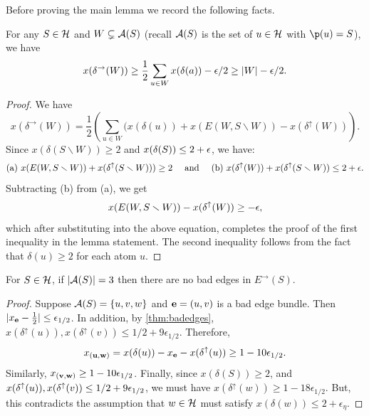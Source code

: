 Before proving the main lemma we record the following facts.
\begin{lemma}
\label{fact:anothercutineq}
For any $S\in \mathcal{H}$ %
and $W \subsetneq {\cal A}(S)$ (recall ${\cal A}(S)$ is the set of $u \in \mathcal{H}$ with $\p(u) = S$), we have 
$$ x(\delta^\rightarrow(W))  %
	\geq \frac12 \sum_{u\in W} x(\delta(a)) - \eps/2 \ge |W| - \eps/2.$$
\end{lemma}
\begin{proof}
We have
$$ x(\delta^\rightarrow (W))  %
= \frac12 \left(\sum_{u \in W} (x(\delta (u)) +   x(	E(W, S\smallsetminus W)) -  x(\delta ^\uparrow (W))\right).$$
Since $x(\delta (S\smallsetminus W)) \ge 2$ and $x(\delta (S)) \le 2 + {\epsilon}$, we have:
$$\text{(a) }  x(	E(W, S\smallsetminus W)) + x(\delta^\uparrow(S\smallsetminus W)))\ge 2 \quad\text{ and }\quad\text{(b) }  x(\delta^\uparrow(W)) +  x(	\delta^\uparrow( S\smallsetminus W)) \le 2 + {\epsilon}.$$
Subtracting (b) from (a), we get
$$x(	E(W, S\smallsetminus W)) - x(\delta ^\uparrow (W)) \ge -{\epsilon},$$
which after substituting into the above equation,
completes the proof of the first inequality in the lemma statement. The second inequality follows from the fact that $\delta (u) \ge 2$ for each atom $u$.
\end{proof}


\begin{lemma}\label{lem:three-nodes-good}
For $S \in\mathcal{H}$, if $|{\cal A}(S)|=3$ then there are no bad edges in \hyperlink{tar:ErightarrowS}{$E^\rightarrow(S)$}.
\end{lemma}
\begin{proof}
Suppose  ${\cal A}(S)=\{u,v,w\}$ and
${\bf e}=(u,v)$  is a bad edge bundle. Then $|x_{\bf e} - \frac{1}{2}| \le \epsilon_{1/2}$. In addition, by \cref{thm:badedges}, $x(\delta^\uparrow(u)),x(\delta^\uparrow(v)) \le 1/2+9\epsilon_{1/2}$. Therefore, 
$$x_{\bf(u,w)} = x(\delta(u)) - x_{{\bf e}} -  x(\delta^\uparrow(u))\geq 1-10\epsilon_{1/2}.$$
Similarly, $x_{\bf(v,w)}\geq 1-10{\epsilon}_{1/2}$.
Finally, since $x(\delta (S)) \ge 2$, and $x(\delta^\uparrow(u)),x(\delta^\uparrow(v))\leq 1/2+9{\epsilon}_{1/2}$, we must have $x(\delta^\uparrow(w)) \ge 1-18\epsilon_{1/2}$.
But, this contradicts the assumption that $w\in \mathcal{H}$ must satisfy $x(\delta(w))\leq 2+\epsilon_\eta$.
\end{proof}



